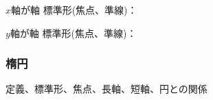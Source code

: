 \documentclass[10pt,dvipdfmx]{jsarticle}
\begin{document}
\begin{multicols}{2}
  \begin{minipage}{0.45\textwidth}
    \begin{itembox}[l]{$x$軸が軸}
      標準形(焦点、準線)：\\
      \begin{center}
      \end{center}
    \end{itembox}

  \end{minipage}
  \begin{minipage}{0.45\textwidth}
    \begin{itembox}[l]{$y$軸が軸}
      標準形(焦点、準線)：\\
      \begin{center}
      \end{center}

    \end{itembox}
  \end{minipage}
\end{multicols}


\subsubsection*{楕円}
\begin{itembox}[l]{定義、標準形、焦点、長軸、短軸、円との関係}
  \vspace{20mm}
\end{itembox}
\end{document}
